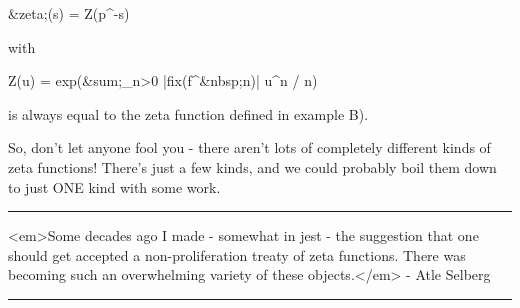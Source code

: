 &zeta;(s) = Z(p^{-s})

with 

Z(u) = exp(&sum;_{n>0} |fix(f^{&nbsp;n})| u^{n} / n)

is always equal to the zeta function defined in example B).

So, don't let anyone fool you - there aren't lots of completely
different kinds of zeta functions!  There's just a few kinds, and 
we could probably boil them down to just ONE kind with some work.







\par\noindent\rule{\textwidth}{0.4pt}
<em>Some decades ago I made - somewhat in jest - the suggestion that one should 
get accepted a non-proliferation treaty of zeta functions.  There was 
becoming such an overwhelming variety of these objects.</em> - Atle Selberg

\par\noindent\rule{\textwidth}{0.4pt}

